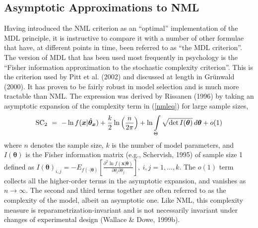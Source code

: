 \documentclass{elsart}
\begin{document}
\subsection{Asymptotic Approximations to NML}

Having introduced the NML criterion as an ``optimal'' implementation of the MDL principle,
it is instructive to compare it with a number of
other formulae that have, at different points in time, been referred to as ``the MDL criterion''.
The version of MDL that has been used most frequently in psychology
is the ``Fisher information approximation to the stochastic complexity criterion''. This is the
criterion used by Pitt et al. (2002) and discussed at length
in Gr\"{u}nwald (2000). It has proven to be fairly robust in model selection and is
much more tractable than NML. The expression was derived
by Rissanen (1996) by taking an asymptotic expansion of the complexity term in (\ref{nmleq})
for large sample sizes,
\begin{equation}\label{approx}
\mbox{SC}_2 ~ =~   -\ln f(\bm{x}|\hat{\bm{\theta}}_{\bm{x}}) + \frac{k}{2} \ln \left(
\frac{n}{2\pi} \right) + \ln \int_{\Theta} \sqrt{\det I(\bm{\theta})} \, d\bm{\theta} + o(1)\\
\end{equation}
where $n$ denotes the sample size, $k$ is the number of model parameters, and $I(\bm\theta)$ is
the Fisher information matrix (e.g., Schervish, 1995) of sample size 1 defined as $
I(\bm\theta)_{i,j} = -E_{f(\cdot | \bm\theta)} \left[ \frac{\partial^2 \ln f(\bm x|\bm
\theta)}{\partial\theta_i \partial \theta_j} \right], \ i, j=1,...,k$. The $o(1)$ term collects
all the higher-order terms in the asymptotic expansion, and vanishes as $n \rightarrow \infty$.
The second and third terms together are often referred to as the complexity of the model, albeit
an asymptotic one. Like NML, this complexity measure is reparametrization-invariant and is not
necessarily invariant under changes of experimental design (Wallace \& Dowe, 1999b).
\end{document}
